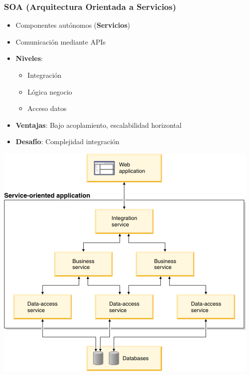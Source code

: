 \subsubsection{SOA (Arquitectura Orientada a Servicios)}
\begin{itemize}
    \item Componentes autónomos (\textbf{Servicios})
    \item Comunicación mediante APIs
    \item \textbf{Niveles}:
    \begin{itemize}
        \item Integración
        \item Lógica negocio
        \item Acceso datos
    \end{itemize}
    \item \textbf{Ventajas}: Bajo acoplamiento, escalabilidad horizontal
    \item \textbf{Desafío}: Complejidad integración
\end{itemize}
\hfill
\begin{minipage}{0.5\textwidth}
    \includegraphics[width=\linewidth]{imagenes/soa}
\end{minipage}

